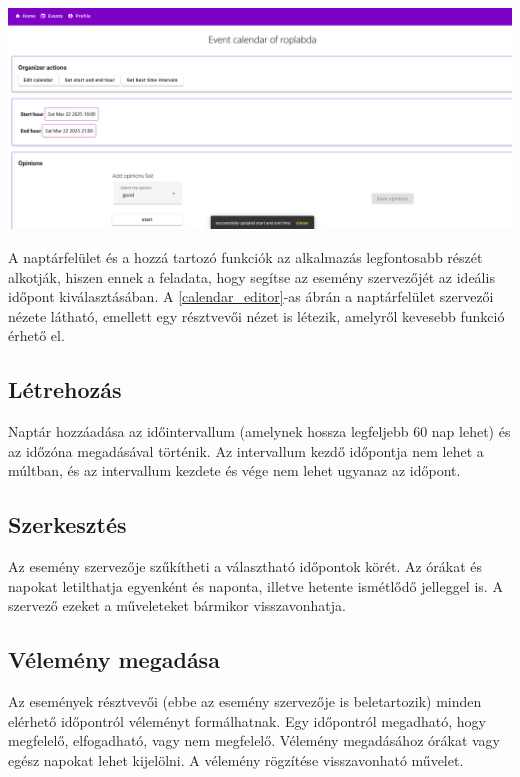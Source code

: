 \documentclass[a4paper,12pt]{report}
\theoremstyle{definition}
\theoremstyle{remark}
\begin{document}
\begin{center}
\includegraphics[width=150mm]{calendar_editor}
\captionsetup{width=0.8\linewidth}
\label{calendar_editor}
\end{center}

A naptárfelület és a hozzá tartozó funkciók az alkalmazás legfontosabb részét alkotják, hiszen ennek a feladata, hogy segítse az esemény szervezőjét az ideális időpont kiválasztásában. A \ref{calendar_editor}-as ábrán a naptárfelület szervezői nézete látható, emellett egy résztvevői nézet is létezik, amelyről kevesebb funkció érhető el.

	\subsection{Létrehozás}

Naptár hozzáadása az időintervallum (amelynek hossza legfeljebb 60 nap lehet) és az időzóna megadásával történik. Az intervallum kezdő időpontja nem lehet a múltban, és az intervallum kezdete és vége nem lehet ugyanaz az időpont.

	\subsection{Szerkesztés}

Az esemény szervezője szűkítheti a választható időpontok körét. Az órákat és napokat letilthatja egyenként és naponta, illetve hetente ismétlődő jelleggel is. A szervező ezeket a műveleteket bármikor visszavonhatja.

	\subsection{Vélemény megadása}

Az események résztvevői (ebbe az esemény szervezője is beletartozik) minden elérhető időpontról véleményt formálhatnak. Egy időpontról megadható, hogy megfelelő, elfogadható, vagy nem megfelelő. Vélemény megadásához órákat vagy egész napokat lehet kijelölni. A vélemény rögzítése visszavonható művelet.
\end{document}
